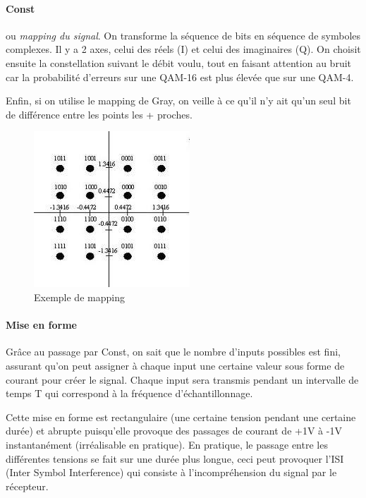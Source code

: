 \paragraph{Const} ou \textit{mapping du signal}. On transforme la séquence de bits en séquence de symboles complexes. Il y a 2 axes, celui des réels (I) et celui des imaginaires (Q). On choisit  ensuite la constellation suivant le débit voulu, tout en faisant attention au bruit car la probabilité d'erreurs sur une QAM-16 est plus élevée que sur une
QAM-4.

Enfin, si on utilise le mapping de Gray, on veille à ce qu'il n'y ait qu'un seul bit de différence entre les points les + proches.

\begin{figure}[H]
    \centering
    \includegraphics[width=0.5\linewidth]{img/mapping.png}
    \caption{Exemple de mapping}
\end{figure}

\paragraph{Mise en forme} Grâce au passage par Const, on sait que le nombre d'inputs possibles est fini, assurant qu'on peut assigner à chaque input une certaine valeur sous forme de courant pour créer le signal. Chaque input sera transmis pendant un intervalle de temps T qui correspond à la fréquence d'échantillonnage.

Cette mise en forme est rectangulaire (une certaine tension pendant une certaine durée) et \og{}abrupte\fg{} puisqu'elle provoque des passages de courant de +1V à -1V instantanément (irréalisable en pratique). En pratique, le passage entre les différentes tensions se fait sur une durée plus longue, ceci peut provoquer l'ISI (Inter Symbol Interference) qui consiste à l'incompréhension du signal par le récepteur.

